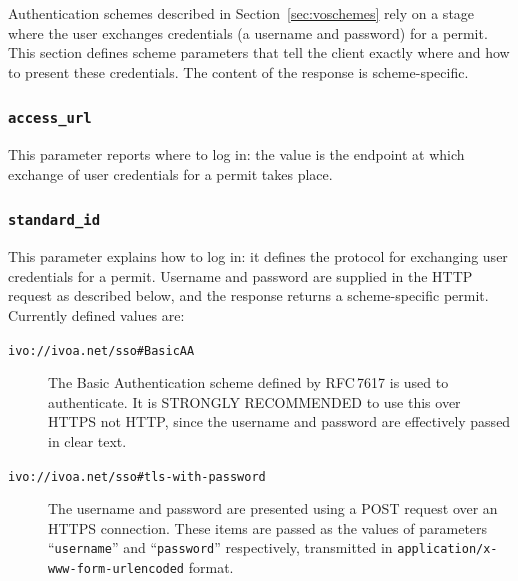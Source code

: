 \documentclass[11pt,a4paper]{ivoa}
\newcommand{\rfc}[1]{RFC\,#1}
\begin{document}
Authentication schemes described in Section~\ref{sec:voschemes}
rely on a stage where the user exchanges 
credentials (a username and password) for a permit.
This section defines scheme parameters that
tell the client exactly where and how to present these credentials.
The content of the response is scheme-specific.

\subsubsection{\mbox{\tt access\_url}}
\label{sec:access-url}

This parameter reports where to log in:
the value is the endpoint at which
exchange of user credentials for a permit
takes place.

\subsubsection{\mbox{\tt standard\_id}}
\label{sec:standard-id}

This parameter explains how to log in:
it defines the protocol for exchanging user credentials
for a permit.
Username and password are supplied in the HTTP request as described below,
and the response returns a scheme-specific permit.
Currently defined values are:

\begin{description}
  \item[{\tt ivo://ivoa.net/sso\#BasicAA}]
        The Basic Authentication scheme defined by \rfc{7617} is used to
        authenticate.
        It is STRONGLY RECOMMENDED to use this over HTTPS not HTTP,
        since the username and password are effectively passed in clear text.
  \item[{\tt ivo://ivoa.net/sso\#tls-with-password}]
        The username and password are presented using a POST request
        over an HTTPS connection.
        These items are passed as the values of parameters
        ``{\tt username}'' and ``{\tt password}'' respectively,
        transmitted in {\tt application/x-www-form-urlencoded} format.
\end{description}

\end{document}
